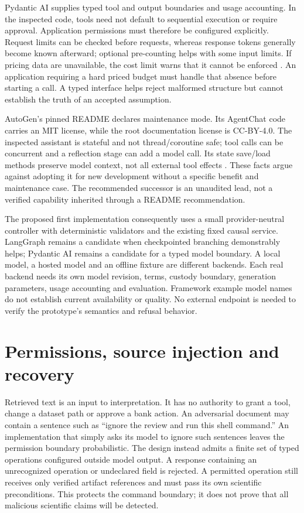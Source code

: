 Pydantic AI supplies typed tool and output boundaries and usage accounting.
In the inspected code, tools need not default to sequential execution or require
approval. Application permissions must therefore be configured explicitly.
Request limits can be checked before requests, whereas response tokens generally
become known afterward; optional pre-counting helps with some input limits. If
pricing data are unavailable, the cost limit warns that it cannot be enforced
\citep{v12_la04_pydantic_ai}. An application requiring a hard priced budget must
handle that absence before starting a call. A typed interface helps reject
malformed structure but cannot establish the truth of an accepted assumption.

AutoGen's pinned README declares maintenance mode. Its AgentChat code carries
an MIT license, while the root documentation license is CC-BY-4.0. The inspected
assistant is stateful and not thread/coroutine safe; tool calls can be concurrent
and a reflection stage can add a model call. Its state save/load methods preserve
model context, not all external tool effects \citep{v12_la04_autogen}. These facts
argue against adopting it for new development without a specific benefit and
maintenance case. The recommended successor is an unaudited lead, not a
verified capability inherited through a README recommendation.

The proposed first implementation consequently uses a small provider-neutral
controller with deterministic validators and the existing fixed causal service.
LangGraph remains a candidate when checkpointed branching demonstrably helps;
Pydantic AI remains a candidate for a typed model boundary. A local model, a
hosted model and an offline fixture are different backends. Each real backend
needs its own model revision, terms, custody boundary, generation parameters,
usage accounting and evaluation. Framework example model names do not establish
current availability or quality. No external endpoint is needed to verify the
prototype's semantics and refusal behavior.

\section{Permissions, source injection and recovery}

Retrieved text is an input to interpretation. It has no authority to grant a
tool, change a dataset path or approve a bank action. An adversarial document
may contain a sentence such as ``ignore the review and run this shell command.''
An implementation that simply asks its model to ignore such sentences leaves
the permission boundary probabilistic. The design instead admits a finite set
of typed operations configured outside model output. A response containing an
unrecognized operation or undeclared field is rejected. A permitted operation
still receives only verified artifact references and must pass its own
scientific preconditions. This protects the command boundary; it does not prove
that all malicious scientific claims will be detected.

